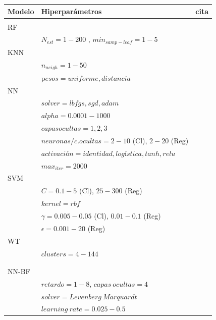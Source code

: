 \documentclass[12pt]{article}
\begin{document}
\begin{table}
\centering
\begin{tabular}{|l l l|}
\hline
Modelo  & Hiperparámetros & cita\\
\hline
    &&\\
RF  &&\\
    &  $N_{est}= 1-200$ , $min_{samp-leaf} =  1-5$& \\

KNN &&\\
    & $n_{neigh}= 1-50$ &\\
    &p$esos = uniforme, distancia$&\\
 

NN  &&\\
    &$solver = lbfgs, sgd, adam$&\\
    &$alpha = 0.0001-1000$&\\
    &$capas ocultas = 1,2,3$& \citeauthor{Manuel}\\
    &$neuronas / c. ocultas = 2-10$ (Cl), $2-20$ (Reg)&\\
    &$activación = identidad, logística, tanh, relu$&\\
    &$max_{iter} = 2000$&\\


 SVM   &&\\
     &$C = 0.1-5$ (Cl), $25-300$ (Reg)&\\
     &$kernel = rbf$&\\
     &$\gamma= 0.005-0.05$  (Cl), $0.01-0.1$ (Reg)&\\
     &$\epsilon=  0.001-20 $  (Reg)&\\


WT   &&\\
    &$clusters = 4-144$&\\
     &&\\
\hline
   &&\\
NN-BF   &&\\
    &$retardo =  1-8$,  $ capas~ocultas = 4$&\\
     &$solver = Levenberg~Marquardt$&\\
     &$learning~rate = 0.025-0.5$&\\


\end{tabular}
\end{table}
\end{document}
